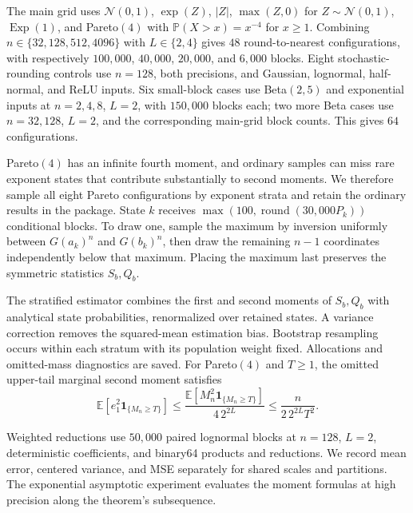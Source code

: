The main grid uses $\mathcal N(0,1)$, $\exp(Z)$, $|Z|$, $\max(Z,0)$
for $Z\sim\mathcal N(0,1)$, $\operatorname{Exp}(1)$, and Pareto$(4)$
with $\mathbb P(X>x)=x^{-4}$ for $x\ge1$.
Combining $n\in\{32,128,512,4096\}$ with $L\in\{2,4\}$ gives $48$
round-to-nearest configurations, with respectively
$100{,}000$, $40{,}000$, $20{,}000$, and $6{,}000$ blocks.
Eight stochastic-rounding controls use $n=128$, both precisions, and
Gaussian, lognormal, half-normal, and ReLU inputs.
Six small-block cases use Beta$(2,5)$ and exponential inputs at $n=2,4,8$,
$L=2$, with $150{,}000$ blocks each; two more Beta cases use
$n=32,128$, $L=2$, and the corresponding main-grid block counts.
This gives $64$ configurations.

Pareto$(4)$ has an infinite fourth moment, and ordinary samples can miss
rare exponent states that contribute substantially to second moments.
We therefore sample all eight Pareto configurations by exponent strata
and retain the ordinary results in the package. State $k$ receives
$\max(100,\operatorname{round}(30{,}000P_k))$ conditional blocks.
To draw one, sample the maximum by inversion uniformly between
$G(a_k)^n$ and $G(b_k)^n$, then draw the remaining $n-1$ coordinates
independently below that maximum. Placing the maximum last preserves
the symmetric statistics $S_b,Q_b$.

The stratified estimator combines the first and second moments of
$S_b,Q_b$ with analytical state probabilities, renormalized over retained
states. A variance correction removes the squared-mean estimation bias.
Bootstrap resampling occurs within each stratum with its population
weight fixed. Allocations and omitted-mass diagnostics are saved.
For Pareto$(4)$ and $T\ge1$, the omitted upper-tail marginal second moment
satisfies
\begin{equation}\label{eq:pareto-tail-bound}
 \mathbb E[e_1^2\mathbf1_{\{M_n\ge T\}}]
 \le\frac{\mathbb E[M_n^2\mathbf1_{\{M_n\ge T\}}]}{4\,2^{2L}}
 \le\frac{n}{2\,2^{2L}T^2}.
\end{equation}

Weighted reductions use $50{,}000$ paired lognormal blocks at $n=128$,
$L=2$, deterministic coefficients, and binary64 products and reductions.
We record mean error, centered variance, and MSE separately for shared
scales and partitions. The exponential asymptotic experiment evaluates
the moment formulas at high precision along the theorem's subsequence.
